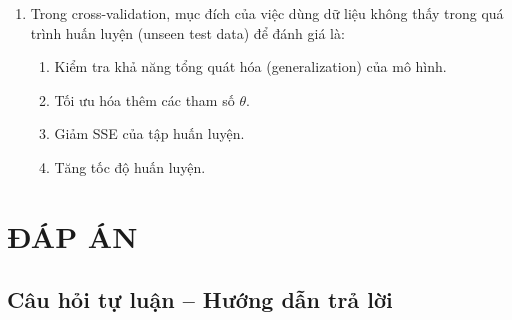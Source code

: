 \documentclass[10pt]{article}
\begin{document}
\begin{enumerate}[leftmargin=*, label=\textbf{Câu \arabic*.}]
    \item Trong cross-validation, mục đích của việc dùng dữ liệu không thấy trong quá trình huấn luyện (unseen test data) để đánh giá là:
    \begin{enumerate}[label=\Alph*.]
        \item Kiểm tra khả năng tổng quát hóa (generalization) của mô hình.
        \item Tối ưu hóa thêm các tham số $\theta$.
        \item Giảm SSE của tập huấn luyện.
        \item Tăng tốc độ huấn luyện.
    \end{enumerate}

\end{enumerate}

\newpage
\section*{ĐÁP ÁN}

\subsection*{Câu hỏi tự luận -- Hướng dẫn trả lời}
\end{document}

